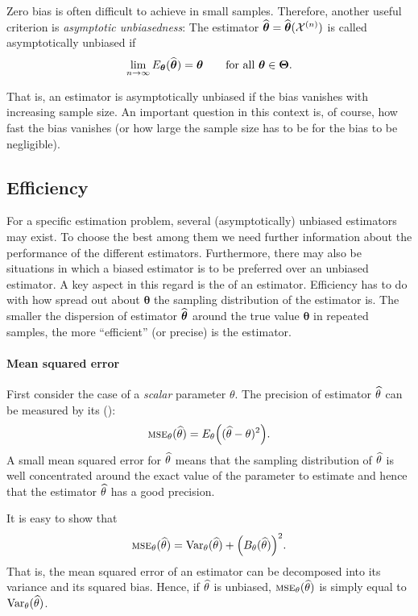 Zero bias is often difficult to achieve in small samples. Therefore, another
useful criterion is \emph{asymptotic unbiasedness}: The estimator
$\widehat{\boldsymbol\theta} = \widehat{\boldsymbol\theta}(\mathcal{X}^{(n)})$ is
called asymptotically unbiased if
\[
    \lim_{n \rightarrow \infty} E_{\boldsymbol\theta}(\widehat{\boldsymbol\theta}) = \boldsymbol\theta
    \qquad
    \text{for all $\boldsymbol\theta \in \boldsymbol\Theta$}.
\]

That is, an estimator is asymptotically unbiased if the bias vanishes with 
increasing sample size. An important question in this context is, of course, how 
fast the bias vanishes (or how large the sample size has to be for the bias to be 
negligible).

\subsection{Efficiency}

For a specific estimation problem, several (asymptotically) unbiased estimators
may exist. To choose the best among them we need further information about the
performance of the different estimators. Furthermore, there may also be
situations in which a biased estimator is to be preferred over an unbiased
estimator. A key aspect in this regard is the \emph{} of an
estimator. Efficiency has to do with how spread out about $\boldsymbol\theta$
the sampling distribution of the estimator is. The smaller the dispersion of
estimator $\widehat{\boldsymbol\theta}$ around the true value
$\boldsymbol\theta$ in repeated samples, the more “efficient” (or precise) is
the estimator.

\paragraph{Mean squared error}

First consider the case of a \emph{scalar} parameter $\theta$. The
precision of estimator $\widehat{\theta}$ can be measured by its
\emph{} ():
\[
    \stsc{MSE}_{\theta}(\sthat{\theta}) 
    = E_{\theta} \left((\sthat{\theta} - \theta)^2\right).
\]
A small mean squared error for $\widehat{\theta}$ means that the sampling
distribution of $\widehat{\theta}$ is well concentrated around the exact value
of the parameter to estimate and hence that the estimator $\widehat{\theta}$
has a good precision.

It is easy to show that
\[
    \stsc{MSE}_{\theta}(\sthat{\theta})
    = \mathrm{Var}_{\theta}(\sthat{\theta}) 
      + \left(B_{\theta}(\sthat{\theta})\right)^2.
\]
That is, the mean squared error of an estimator can be decomposed into its
variance and its squared bias. Hence, if $\widehat{\theta}$ is unbiased,
$\stsc{MSE}_{\theta}(\sthat{\theta})$ is simply equal to
$\mathrm{Var}_{\theta}(\widehat{\theta})$.

